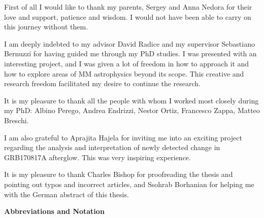 \documentclass[
openright,
12pt, %
english,%
onehalfspacing, %
nolistspacing, %
nohyperref, %
headsepline, %
]{MastersDoctoralThesis} %
\newcommand{\GRB}{GRB170817A}
\begin{document}
\begin{acknowledgements}
    \addchaptertocentry{\acknowledgementname} %
    First of all I would like to thank my parents, Sergey and 
    Anna Nedora for their love and support, patience and 
    wisdom. I would not have been able to carry on this journey 
    without them. 
    
    I am deeply indebted to my advisor David Radice and my 
    supervisor Sebastiano Bernuzzi for having guided me through 
    my PhD studies. I was presented with an interesting 
    project, and I was given a lot of freedom in how to approach 
    it and how to explore areas of \ac{MM} astrophysics beyond 
    its scope. This creative and research freedom facilitated 
    my desire to continue the research. 
    
    It is my pleasure to thank all the people with whom I worked 
    most closely during my PhD: 
    Albino Perego, Andrea Endrizzi, Nestor Ortiz, Francesco Zappa, 
    Matteo Breschi.
    
    I am also grateful to Aprajita Hajela for inviting me into 
    an exciting project regarding the analysis and interpretation 
    of newly detected change in \GRB{} afterglow. This was 
    very inspiring experience. 
    
    It is my pleasure to thank Charles Bishop for proofreading 
    the thesis and pointing out typos and incorrect articles, and Ssohrab Borhanian for helping me with the German abstract of this thesis. 
\end{acknowledgements}


\tableofcontents %




\newpage
\begin{Huge}
    \textbf{Abbreviations and Notation}
\end{Huge}
\end{document}

